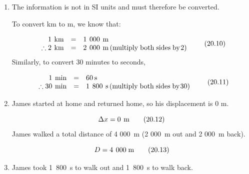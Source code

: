 {\begin{mdframed}[linewidth=4, leftmargin=40, rightmargin=40]
\begin{exercise}
\begin{enumerate}[noitemsep, label=\textbf{Step} \textbf{\arabic*}. ]
      \item  
      \label{m38791*id64758}The information is not in SI units and must therefore be converted.\par 
      \label{m38791*id64762}To convert km to m, we know that:\par 
      \label{m38791*id64767}\nopagebreak\noindent{}
    \begin{equation}
    \begin{array}{ccc}\hfill 1\phantom{\rule{4pt}{0ex}}\mathrm{km}& =& 1\phantom{\rule{4pt}{0ex}}000\phantom{\rule{4pt}{0ex}}\mathrm{m}\hfill \\ \hfill \therefore 2\phantom{\rule{4pt}{0ex}}\mathrm{km}& =& 2\phantom{\rule{4pt}{0ex}}000\phantom{\rule{4pt}{0ex}}\mathrm{m}\left(\mathrm{multiply\; both\; sides\; by}\phantom{\rule{1pt}{0ex}}2\right)\hfill \end{array}\tag{20.10}
      \end{equation}
      \label{m38791*id64905}Similarly, to convert 30 minutes to seconds,\par 
      \label{m38791*id64911}\nopagebreak\noindent{}
    \begin{equation}
    \begin{array}{ccc}\hfill 1\phantom{\rule{4pt}{0ex}}\mathrm{min}& =& 60\phantom{\rule{2pt}{0ex}}\mathrm{s}\hfill \\ \hfill \therefore 30\phantom{\rule{4pt}{0ex}}\mathrm{min}& =& 1\phantom{\rule{4pt}{0ex}}800\phantom{\rule{4pt}{0ex}}\mathrm{s}\left(\mathrm{multiply\; both\; sides\; by}\phantom{\rule{1pt}{0ex}} 30\right)\hfill \end{array}\tag{20.11}
      \end{equation}
      \item  
      \label{m38791*id65016}James started at home and returned home, so his displacement is 0 m.\par 
      \label{m38791*id65020}\nopagebreak\noindent{}
        
    \begin{equation}
    \Delta x=0\phantom{\rule{4pt}{0ex}}\mathrm{m}\tag{20.12}
      \end{equation}
      \label{m38791*id65046}James walked a total distance of 4 000~m (2 000~m out and 2 000~m back).\par 
      \label{m38791*id65052}\nopagebreak\noindent{}
    \begin{equation}
    D=4\phantom{\rule{4pt}{0ex}}000\phantom{\rule{0.277778em}{0ex}}\mathrm{m}\tag{20.13}
      \end{equation}
      \item  
      \label{m38791*id65086}James took 1~800~s to walk out and 1~800~s to walk back.\par 
      \label{m38791*id65090}\nopagebreak\noindent{}
        

\end{enumerate}
\end{exercise}
\end{mdframed}}
